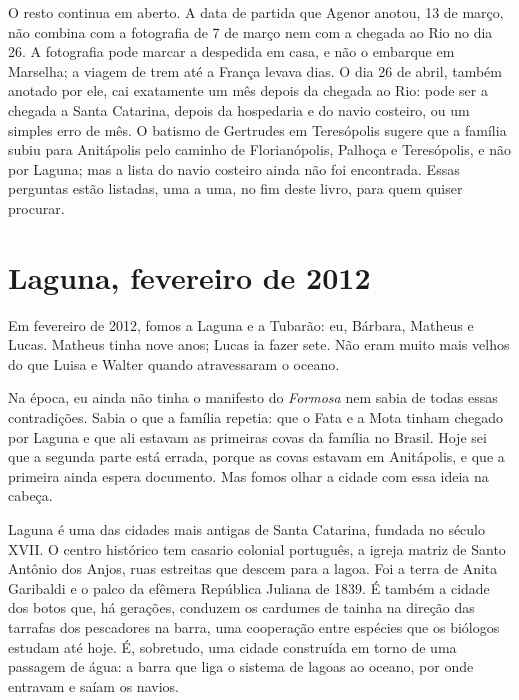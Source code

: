 \documentclass[
  brazilian,
  11pt,
  openany]{book}
\begin{document}
O resto continua em aberto. A data de partida que Agenor anotou, 13 de
março, não combina com a fotografia de 7 de março nem com a chegada ao
Rio no dia 26. A fotografia pode marcar a despedida em casa, e não o
embarque em Marselha; a viagem de trem até a França levava dias. O dia
26 de abril, também anotado por ele, cai exatamente um mês depois da
chegada ao Rio: pode ser a chegada a Santa Catarina, depois da
hospedaria e do navio costeiro, ou um simples erro de mês. O batismo de
Gertrudes em Teresópolis sugere que a família subiu para Anitápolis pelo
caminho de Florianópolis, Palhoça e Teresópolis, e não por Laguna; mas a
lista do navio costeiro ainda não foi encontrada. Essas perguntas estão
listadas, uma a uma, no fim deste livro, para quem quiser procurar.

\section{Laguna, fevereiro de 2012}\label{laguna-fevereiro-de-2012}

Em fevereiro de 2012, fomos a Laguna e a Tubarão: eu, Bárbara, Matheus e
Lucas. Matheus tinha nove anos; Lucas ia fazer sete. Não eram muito mais
velhos do que Luisa e Walter quando atravessaram o oceano.

Na época, eu ainda não tinha o manifesto do \emph{Formosa} nem sabia de
todas essas contradições. Sabia o que a família repetia: que o Fata e a
Mota tinham chegado por Laguna e que ali estavam as primeiras covas da
família no Brasil. Hoje sei que a segunda parte está errada, porque as
covas estavam em Anitápolis, e que a primeira ainda espera documento.
Mas fomos olhar a cidade com essa ideia na cabeça.

Laguna é uma das cidades mais antigas de Santa Catarina, fundada no
século XVII. O centro histórico tem casario colonial português, a igreja
matriz de Santo Antônio dos Anjos, ruas estreitas que descem para a
lagoa. Foi a terra de Anita Garibaldi e o palco da efêmera República
Juliana de 1839. É também a cidade dos botos que, há gerações, conduzem
os cardumes de tainha na direção das tarrafas dos pescadores na barra,
uma cooperação entre espécies que os biólogos estudam até hoje. É,
sobretudo, uma cidade construída em torno de uma passagem de água: a
barra que liga o sistema de lagoas ao oceano, por onde entravam e saíam
os navios.
\end{document}
